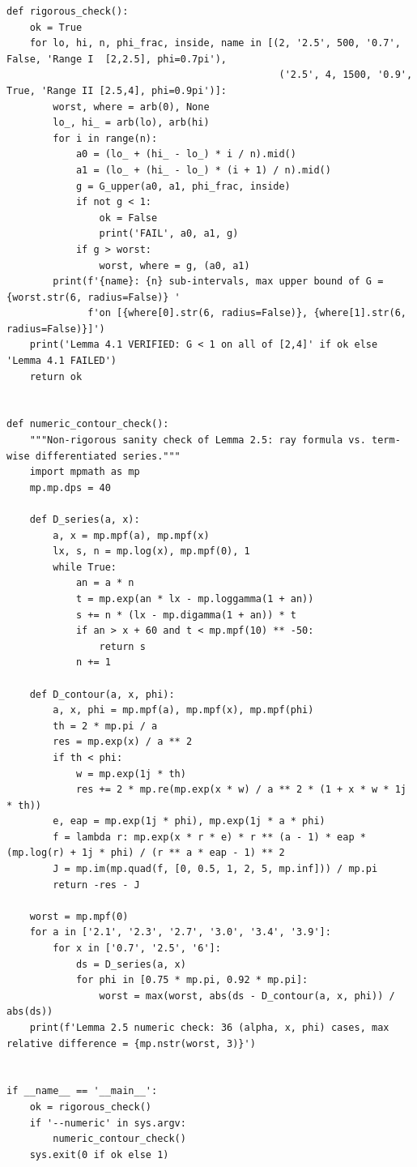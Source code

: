 \documentclass[11pt,a4paper]{article}
\theoremstyle{plain}
\theoremstyle{remark}
\begin{document}
\begin{lstlisting}
def rigorous_check():
    ok = True
    for lo, hi, n, phi_frac, inside, name in [(2, '2.5', 500, '0.7', False, 'Range I  [2,2.5], phi=0.7pi'),
                                               ('2.5', 4, 1500, '0.9', True, 'Range II [2.5,4], phi=0.9pi')]:
        worst, where = arb(0), None
        lo_, hi_ = arb(lo), arb(hi)
        for i in range(n):
            a0 = (lo_ + (hi_ - lo_) * i / n).mid()
            a1 = (lo_ + (hi_ - lo_) * (i + 1) / n).mid()
            g = G_upper(a0, a1, phi_frac, inside)
            if not g < 1:
                ok = False
                print('FAIL', a0, a1, g)
            if g > worst:
                worst, where = g, (a0, a1)
        print(f'{name}: {n} sub-intervals, max upper bound of G = {worst.str(6, radius=False)} '
              f'on [{where[0].str(6, radius=False)}, {where[1].str(6, radius=False)}]')
    print('Lemma 4.1 VERIFIED: G < 1 on all of [2,4]' if ok else 'Lemma 4.1 FAILED')
    return ok


def numeric_contour_check():
    """Non-rigorous sanity check of Lemma 2.5: ray formula vs. term-wise differentiated series."""
    import mpmath as mp
    mp.mp.dps = 40

    def D_series(a, x):
        a, x = mp.mpf(a), mp.mpf(x)
        lx, s, n = mp.log(x), mp.mpf(0), 1
        while True:
            an = a * n
            t = mp.exp(an * lx - mp.loggamma(1 + an))
            s += n * (lx - mp.digamma(1 + an)) * t
            if an > x + 60 and t < mp.mpf(10) ** -50:
                return s
            n += 1

    def D_contour(a, x, phi):
        a, x, phi = mp.mpf(a), mp.mpf(x), mp.mpf(phi)
        th = 2 * mp.pi / a
        res = mp.exp(x) / a ** 2
        if th < phi:
            w = mp.exp(1j * th)
            res += 2 * mp.re(mp.exp(x * w) / a ** 2 * (1 + x * w * 1j * th))
        e, eap = mp.exp(1j * phi), mp.exp(1j * a * phi)
        f = lambda r: mp.exp(x * r * e) * r ** (a - 1) * eap * (mp.log(r) + 1j * phi) / (r ** a * eap - 1) ** 2
        J = mp.im(mp.quad(f, [0, 0.5, 1, 2, 5, mp.inf])) / mp.pi
        return -res - J

    worst = mp.mpf(0)
    for a in ['2.1', '2.3', '2.7', '3.0', '3.4', '3.9']:
        for x in ['0.7', '2.5', '6']:
            ds = D_series(a, x)
            for phi in [0.75 * mp.pi, 0.92 * mp.pi]:
                worst = max(worst, abs(ds - D_contour(a, x, phi)) / abs(ds))
    print(f'Lemma 2.5 numeric check: 36 (alpha, x, phi) cases, max relative difference = {mp.nstr(worst, 3)}')


if __name__ == '__main__':
    ok = rigorous_check()
    if '--numeric' in sys.argv:
        numeric_contour_check()
    sys.exit(0 if ok else 1)
\end{lstlisting}
\end{document}
